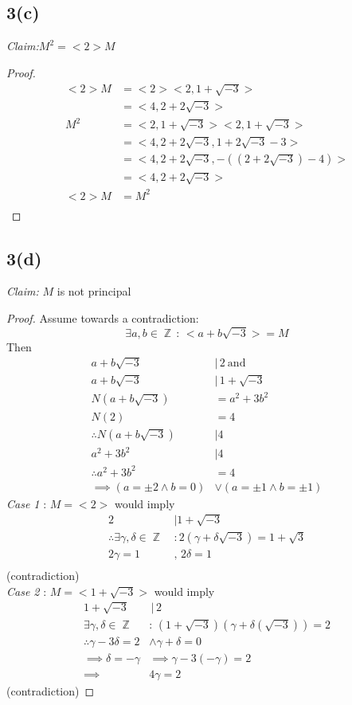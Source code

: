 \documentclass{article}
\DeclareMathOperator{\Z}{\mathbb{Z}}
\begin{document}
\subsection*{3(c)}
\textit{Claim:}$M^2=<2>M$\\
\begin{proof}
	\begin{align*}
	<2>M &= <2><2,1+\sqrt{-3}>\\
	&=<4,2+2\sqrt{-3}>\\
	M^2 &=<2,1+\sqrt{-3}><2,1+\sqrt{-3}>\\
	&=<4,2+2\sqrt{-3},1+2\sqrt{-3}-3>\\
	&=<4,2+2\sqrt{-3},-((2+2\sqrt{-3})-4)>\\
	&=<4,2+2\sqrt{-3}>\\
	<2>M&=M^2\\
	\end{align*}
\end{proof}
\subsection*{3(d)}
\textit{Claim:} $M$ is not principal
\begin{proof}
	Assume towards a contradiction: $$\exists a,b\in\Z\,:\,<a+b\sqrt{-3}>=M$$ Then 
	\begin{align*}
		a+b\sqrt{-3}\,&|\,2 \ \text{and}\\
		a+b\sqrt{-3}\,&|\,1+\sqrt{-3}\\
		N(a+b\sqrt{-3})&=a^2+3b^2\\
		N(2)&=4\\
		\therefore N(a+b\sqrt{-3}) &| 4\\
		a^2+3b^2&|4\\
		\therefore a^2+3b^2&=4\\
		\implies (a=\pm 2\land b=0)&\lor(a=\pm 1\land b=\pm 1)
	\end{align*}
	\textit{Case 1} : $M=<2>$ would imply 
	\begin{align*}
		2&|1+\sqrt{-3}\\
		\therefore\exists\gamma,\delta\in\Z\,&:2(\gamma+\delta\sqrt{-3}) = 1+\sqrt{3}\\
		2\gamma=1&,\,2\delta=1\\
		\end{align*}
	(contradiction)\\
	\textit{Case 2} : $M=<1+\sqrt{-3}>$ would imply
	\begin{align*}
	1+\sqrt{-3}&\,|\,2\\
	\exists\gamma,\delta\in\Z\,&:\,(1+\sqrt{-3})(\gamma+\delta(\sqrt{-3})) = 2\\
	\therefore\gamma-3\delta=2&\land\gamma+\delta=0\\
	\implies \delta=-\gamma&\implies\gamma-3(-\gamma)=2\\
	\implies&4\gamma=2
	\end{align*}
	(contradiction)
\end{proof}
\end{document}
